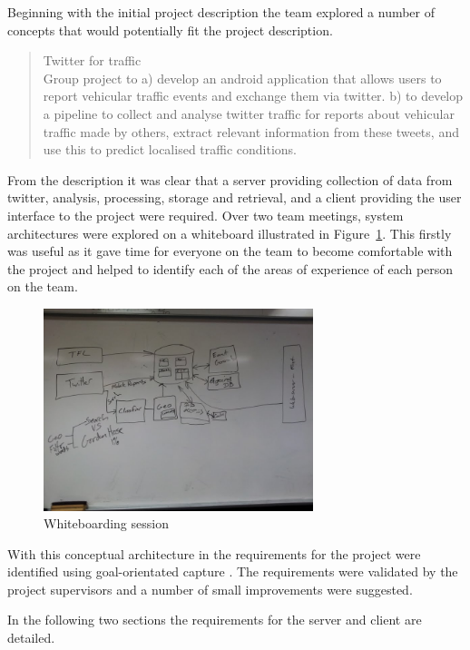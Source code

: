 Beginning with the initial project description the team explored a number of
concepts that would potentially fit the project description.

\begin{quote}
Twitter for traffic\\
Group project to a) develop an android application that allows users to report
vehicular traffic events and exchange them via twitter. b) to develop a
pipeline to collect and analyse twitter traffic for reports about vehicular
traffic made by others, extract relevant information from these tweets, and use
this to predict localised traffic conditions.
\end{quote}

From the description it was clear that a server providing collection of data
from twitter, analysis, processing, storage and retrieval, and a client
providing the user interface to the project were required. Over two team
meetings, system architectures were explored on a whiteboard illustrated in
Figure~\ref{fig:whiteboarding_session}. This firstly was useful as it gave time for
everyone on the team to become comfortable with the project and helped to
identify each of the areas of experience of each person on the team.

\begin{figure}[htb]
\centering
\includegraphics[width=0.7\textwidth]{images/specification/whiteboard_session.jpg}
\caption{Whiteboarding session}
\label{fig:whiteboarding_session}
\end{figure}

With this conceptual architecture in the requirements for the project were
identified using goal-orientated capture \cite{dardenne93}. The requirements were validated by
the project supervisors and a number of small improvements were suggested.

In the following two sections the requirements for the server and client are
detailed.


